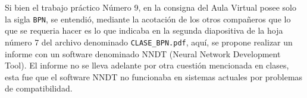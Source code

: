 \documentclass{article}
\begin{document}
Si bien el trabajo práctico Número 9, en la consigna del Aula Virtual posee
solo la sigla \texttt{BPN}, se entendió, mediante la acotación de los otros
compañeros que lo que se requeria hacer es lo que indicaba en la segunda
diapositiva de la hoja número 7 del archivo denominado \texttt{CLASE\_BPN.pdf},
aquí, se propone realizar un informe con un software denominado NNDT (Neural
Network Development Tool). El informe no se lleva adelante por otra cuestión
mencionada en clases, esta fue que el software NNDT no funcionaba en sistemas
actuales por problemas de compatibilidad.
\end{document}
